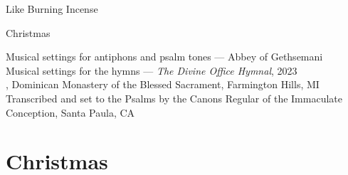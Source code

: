 \documentclass{lbi_cantor_letter}
\begin{document}
\pagestyle{empty}
\onecolumn

\null\vfill
\begin{center}
  \huge Like Burning Incense

  \bigskip\LARGE Christmas

  \vfill\vfill\null

\end{center}


\newpage

\null\vfill
\begin{center}
  \vfill\small
  Musical settings for antiphons and psalm tones --- Abbey of Gethsemani\\
  Musical settings for the hymns --- \emph{The Divine Office Hymnal}, 2023\\
  , Dominican Monastery of the Blessed Sacrament, Farmington Hills, MI\\
  Transcribed and set to the Psalms by the Canons Regular of the Immaculate Conception, Santa Paula, CA
\end{center}

\newpage

\begin{KeepFromToc}
  \tableofcontents
\end{KeepFromToc}

\restoregeometry
\pagestyle{fancy}


\twocolumn

\chapter{Christmas}



\end{document}

